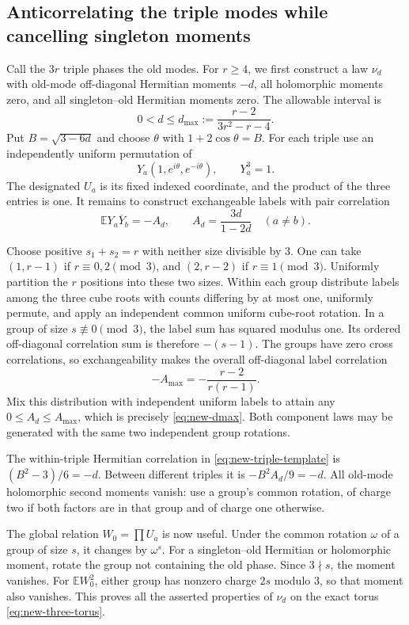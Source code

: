 \documentclass[11pt,a4paper]{article}
\theoremstyle{definition}\newtheorem{definition}[theorem]{Definition}
\theoremstyle{remark}\newtheorem{remark}[theorem]{Remark}
\begin{document}
\subsection{Anticorrelating the triple modes while cancelling singleton moments}
Call the $3r$ triple phases the old modes. For $r\geq4$, we first
construct a law $\nu_d$ with old-mode off-diagonal Hermitian moments
$-d$, all holomorphic moments zero, and all singleton--old Hermitian
moments zero. The allowable interval is
\begin{equation}\label{eq:new-dmax}
 0<d\leq d_{\max}:=\frac{r-2}{3r^2-r-4}.
\end{equation}
Put $B=\sqrt{3-6d}$ and choose $\theta$ with
$1+2\cos\theta=B$. For each triple use an independently uniform
permutation of
\begin{equation}\label{eq:new-triple-template}
 Y_a(1,e^{i\theta},e^{-i\theta}),\qquad Y_a^3=1.
\end{equation}
The designated $U_a$ is its fixed indexed coordinate, and the product
of the three entries is one. It remains to construct exchangeable
labels with pair correlation
\[
 \mathbb E Y_a\overline Y_b=-A_d,
 \qquad A_d=\frac{3d}{1-2d}\quad(a\ne b).
\]

Choose positive $s_1+s_2=r$ with neither size divisible by $3$.
One can take $(1,r-1)$ if $r\equiv0,2\pmod3$, and $(2,r-2)$ if
$r\equiv1\pmod3$. Uniformly partition the $r$ positions into these
two sizes. Within each group distribute labels among the three cube
roots with counts differing by at most one, uniformly permute, and
apply an independent common uniform cube-root rotation. In a group
of size $s\not\equiv0\pmod3$, the label sum has squared modulus
one. Its ordered off-diagonal correlation sum is therefore $-(s-1)$.
The groups have zero cross correlations, so exchangeability makes the
overall off-diagonal label correlation
\[
 -A_{\max}=-\frac{r-2}{r(r-1)}.
\]
Mix this distribution with independent uniform labels to attain any
$0\leq A_d\leq A_{\max}$, which is precisely
\eqref{eq:new-dmax}. Both component laws may be generated with the
same two independent group rotations.

The within-triple Hermitian correlation in
\eqref{eq:new-triple-template} is $(B^2-3)/6=-d$.
Between different triples it is $-B^2A_d/9=-d$.
All old-mode holomorphic second moments vanish: use a group's common
rotation, of charge two if both factors are in that group and of
charge one otherwise.

The global relation $W_0=\prod U_a$ is now useful. Under the common
rotation $\omega$ of a group of size $s$, it changes by $\omega^s$.
For a singleton--old Hermitian or holomorphic moment, rotate the group
not containing the old phase. Since $3\nmid s$, the moment vanishes.
For $\mathbb E W_0^2$, either group has nonzero charge $2s$ modulo $3$,
so that moment also vanishes. This proves all the asserted properties
of $\nu_d$ on the exact torus \eqref{eq:new-three-torus}.
\end{document}
